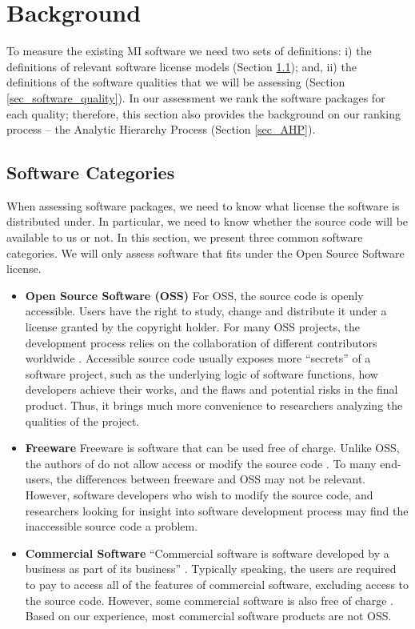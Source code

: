 \documentclass[final, 3p, times, authoryear]{elsarticle}
\begin{document}
\section{Background} \label{ch_background}

To measure the existing MI software we need two sets of definitions: i) the
definitions of relevant software license models (Section
\ref{sec_software_categories}); and, ii) the definitions of the software
qualities that we will be assessing (Section \ref{sec_software_quality}). In our
assessment we rank the software packages for each quality; therefore, this
section also provides the background on our ranking process -- the Analytic
Hierarchy Process (Section \ref{sec_AHP}).

\subsection{Software Categories} \label{sec_software_categories}

When assessing software packages, we need to know what license the software is
distributed under.  In particular, we need to know whether the source code will
be available to us or not.  In this section, we present three common software
categories.  We will only assess software that fits under the Open Source
Software license.

\begin{itemize}

\item \textbf{Open Source Software (OSS)} For OSS, the source code is openly
accessible. Users have the right to study, change and distribute it under a
license granted by the copyright holder. For many OSS projects, the development
process relies on the collaboration of different contributors worldwide
\citep{Corbly2014}. Accessible source code usually exposes more ``secrets'' of a
software project, such as the underlying logic of software functions, how
developers achieve their works, and the flaws and potential risks in the final
product. Thus, it brings much more convenience to researchers analyzing the
qualities of the project.

\item \textbf{Freeware} Freeware is software that can be used free of charge.
Unlike OSS, the authors of do not allow access or modify the source code
\citep{LINFO2006}. To many end-users, the differences between freeware and OSS
may not be relevant. However, software developers who wish to modify the source
code, and researchers looking for insight into software development process may
find the inaccessible source code a problem. 

\item \textbf{Commercial Software} ``Commercial software is software developed
by a business as part of its business'' \citep{GNU2019}. Typically speaking, the
users are required to pay to access all of the features of commercial software,
excluding access to the source code. However, some commercial software is also
free of charge \citep{GNU2019}. Based on our experience, most commercial
software products are not OSS.

\end{itemize}
\end{document}
